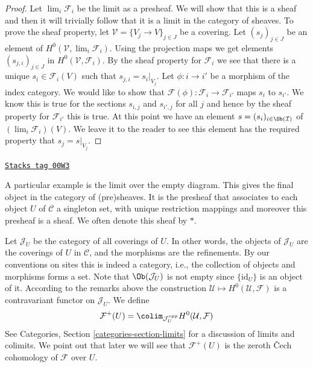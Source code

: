 \begin{proof}
Let $\lim_i \mathcal{F}_i$ be the limit as a presheaf.
We will show that this is a sheaf and then it will trivially follow
that it is a limit in the category of sheaves. To prove the sheaf
property, let $\mathcal{V} = \{V_j \to V\}_{j\in J}$ be a covering.
Let $(s_j)_{j\in J}$ be an element of $H^0(\mathcal{V}, \lim_i \mathcal{F}_i)$.
Using the projection maps we get elements $(s_{j, i})_{j\in J}$
in $H^0(\mathcal{V}, \mathcal{F}_i)$. By the sheaf property for
$\mathcal{F}_i$ we see that there is a unique $s_i \in \mathcal{F}_i(V)$
such that $s_{j, i} = s_i|_{V_j}$. Let $\phi : i \to i'$ be a morphism
of the index category. We would like to show that
$\mathcal{F}(\phi) : \mathcal{F}_i \to \mathcal{F}_{i'}$
maps $s_i$ to $s_{i'}$. We know this is true for the sections
$s_{i, j}$ and $s_{i', j}$ for all $j$ and hence by the sheaf property
for $\mathcal{F}_{i'}$ this is true. At this point we have an
element $s = (s_i)_{i \in \Ob(\mathcal{I})}$ of
$(\lim_i \mathcal{F}_i)(V)$. We leave it to the reader to see
this element has the required property that $s_j = s|_{V_j}$.
\end{proof}

\begin{example}
\label{sites-example-singleton-sheaf}
\href{https://stacks.math.columbia.edu/tag/00W3}{\texttt{Stacks tag 00W3}}

A particular example is the limit over the empty diagram.
This gives the final object in the category of (pre)sheaves.
It is the presheaf that associates
to each object $U$ of $\mathcal{C}$ a singleton set, with unique
restriction mappings and moreover this presheaf is a sheaf.
We often denote this sheaf by $*$.
\end{example}

Let $\mathcal{J}_U$ be the category of all coverings of $U$.
In other words, the objects of $\mathcal{J}_U$ are the coverings
of $U$ in $\mathcal{C}$, and the morphisms are the refinements.
By our conventions on sites this is indeed a category, i.e.,
the collection of objects and morphisms forms a set.
Note that $\Ob(\mathcal{J}_U)$ is not empty since
$\{\text{id}_U\}$ is an object of it. According to the remarks
above the construction $\mathcal{U} \mapsto H^0(\mathcal{U}, \mathcal{F})$
is a contravariant functor on $\mathcal{J}_U$.
We define
$$
\mathcal{F}^{+}(U)
=
\colim_{\mathcal{J}_U^{opp}}
H^0(\mathcal{U}, \mathcal{F})
$$
See Categories, Section \ref{categories-section-limits} for
a discussion of limits and colimits. We point out that later
we will see that $\mathcal{F}^{+}(U)$ is the zeroth {\v C}ech
cohomology of $\mathcal{F}$ over $U$.

